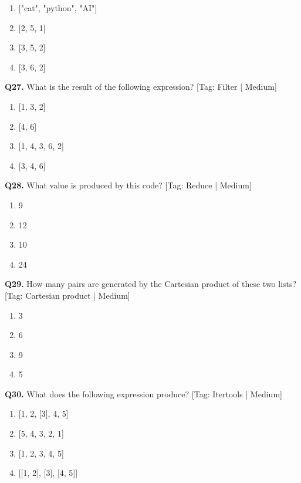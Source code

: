 \begin{enumerate}[label=(\alph*),topsep=2pt,itemsep=1pt,partopsep=0pt,parsep=0pt]
    \item {["cat", "python", "AI"]}
    \item {[2, 5, 1]}
    \item {[3, 5, 2]}
    \item {[3, 6, 2]}
\end{enumerate}
\vspace{2mm}
\noindent\textbf{Q27.} What is the result of the following expression? \hfill [Tag: Filter | Medium]
\begin{enumerate}[label=(\alph*),topsep=2pt,itemsep=1pt,partopsep=0pt,parsep=0pt]
    \item {[1, 3, 2]}
    \item {[4, 6]}
    \item {[1, 4, 3, 6, 2]}
    \item {[3, 4, 6]}
\end{enumerate}
\vspace{2mm}
\noindent\textbf{Q28.} What value is produced by this code? \hfill [Tag: Reduce | Medium]
\begin{enumerate}[label=(\alph*),topsep=2pt,itemsep=1pt,partopsep=0pt,parsep=0pt]
    \item {9}
    \item {12}
    \item {10}
    \item {24}
\end{enumerate}
\vspace{2mm}
\noindent\textbf{Q29.} How many pairs are generated by the Cartesian product of these two lists? \hfill [Tag: Cartesian product | Medium]
\begin{enumerate}[label=(\alph*),topsep=2pt,itemsep=1pt,partopsep=0pt,parsep=0pt]
    \item {3}
    \item {6}
    \item {9}
    \item {5}
\end{enumerate}
\vspace{2mm}
\noindent\textbf{Q30.} What does the following expression produce? \hfill [Tag: Itertools | Medium]
\begin{enumerate}[label=(\alph*),topsep=2pt,itemsep=1pt,partopsep=0pt,parsep=0pt]
    \item {[1, 2, [3], 4, 5]}
    \item {[5, 4, 3, 2, 1]}
    \item {[1, 2, 3, 4, 5]}
    \item {[[1, 2], [3], [4, 5]]}
\end{enumerate}
